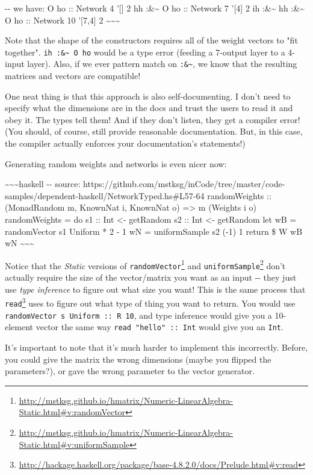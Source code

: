 \documentclass[]{article}
\renewcommand{\href}[2]{#2\footnote{\url{#1}}}
\begin{document}
-\/- we have: O ho :: Network 4 '{[}{]} 2 hh :\&\textasciitilde{} O ho ::
Network 7 '{[}4{]} 2 ih :\&\textasciitilde{} hh :\&\textasciitilde{} O ho ::
Network 10 '{[}7,4{]} 2 \textasciitilde{}\textasciitilde{}\textasciitilde{}

Note that the shape of the constructors requires all of the weight vectors to
"fit together". \texttt{ih\ :\&\textasciitilde{}\ O\ ho} would be a type error
(feeding a 7-output layer to a 4-input layer). Also, if we ever pattern match on
\texttt{:\&\textasciitilde{}}, we know that the resulting matrices and vectors
are compatible!

One neat thing is that this approach is also self-documenting. I don't need to
specify what the dimensions are in the docs and trust the users to read it and
obey it. The types tell them! And if they don't listen, they get a compiler
error! (You should, of course, still provide reasonable documentation. But, in
this case, the compiler actually enforces your documentation's statements!)

Generating random weights and networks is even nicer now:

\textasciitilde{}\textasciitilde{}\textasciitilde{}haskell -\/- source:
https://github.com/mstksg/inCode/tree/master/code-samples/dependent-haskell/NetworkTyped.hs\#L57-64
randomWeights :: (MonadRandom m, KnownNat i, KnownNat o) =\textgreater{} m
(Weights i o) randomWeights = do s1 :: Int \textless{}- getRandom s2 :: Int
\textless{}- getRandom let wB = randomVector s1 Uniform * 2 - 1 wN =
uniformSample s2 (-1) 1 return \$ W wB wN
\textasciitilde{}\textasciitilde{}\textasciitilde{}

Notice that the \emph{Static} versions of
\href{http://mstksg.github.io/hmatrix/Numeric-LinearAlgebra-Static.html\#v:randomVector}{\texttt{randomVector}}
and
\href{http://mstksg.github.io/hmatrix/Numeric-LinearAlgebra-Static.html\#v:uniformSample}{\texttt{uniformSample}}
don't actually require the size of the vector/matrix you want as an input -\/-
they just use \emph{type inference} to figure out what size you want! This is
the same process that
\href{http://hackage.haskell.org/package/base-4.8.2.0/docs/Prelude.html\#v:read}{\texttt{read}}
uses to figure out what type of thing you want to return. You would use
\texttt{randomVector\ s\ Uniform\ ::\ R\ 10}, and type inference would give you
a 10-element vector the same way \texttt{read\ "hello"\ ::\ Int} would give you
an \texttt{Int}.

It's important to note that it's much harder to implement this incorrectly.
Before, you could give the matrix the wrong dimensions (maybe you flipped the
parameters?), or gave the wrong parameter to the vector generator.
\end{document}
